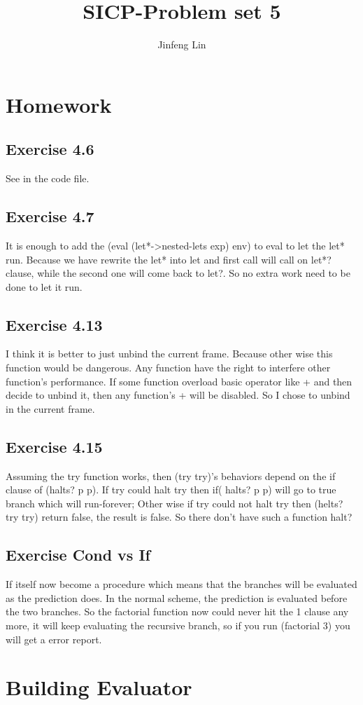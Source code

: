 \documentclass{article}
\begin{document}
\title{SICP-Problem set 5}
\author{Jinfeng Lin}
\maketitle
\clearpage
\section{Homework}
\subsection {Exercise 4.6}
See in the code file.
\subsection {Exercise 4.7}
It is enough to add the (eval (let*->nested-lets exp) env) to eval to let the let* run. Because we have rewrite the let* into let and first call will call on let*? clause, while the second one will come back to let?. So no extra work need to be done to let it run. 
\subsection {Exercise 4.13}
I think it is better to just unbind the current frame. Because other wise this function would be dangerous. Any function have the right to interfere other function's performance. If some function overload basic operator like + and then decide to unbind it, then any function's + will be disabled. So I chose to unbind in the current frame.
\subsection {Exercise 4.15}
\indent \par Assuming the try function works, then (try try)'s behaviors depend on the if clause of (halts? p p). If try could halt try then if( halts? p p) will go to true branch which will run-forever; Other wise if try could not halt try then (helts? try try) return false, the result is false. So there don't have such a function halt? 
\subsection {Exercise  Cond vs If}
\indent \par If itself now become a procedure which means that the branches will be evaluated as the prediction does. In the normal scheme,  the prediction is evaluated before the two branches. So the factorial function now could never hit the 1 clause any more, it will keep evaluating the recursive branch, so if you run (factorial 3) you will get a error report.
\section{Building Evaluator}
\end{document}
